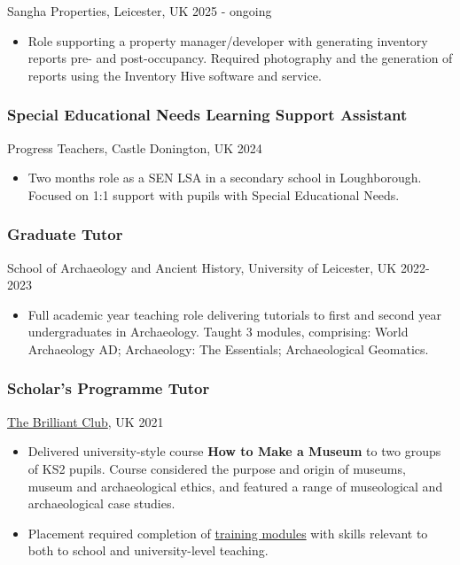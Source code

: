 \documentclass[11pt,a4paper]{article}
\providecommand{\tightlist}{%
  \setlength{\itemsep}{0pt}\setlength{\parskip}{0pt}}
\begin{document}
Sangha Properties, Leicester, UK 2025 - ongoing

\begin{itemize}
\tightlist
\item
  Role supporting a property manager/developer with generating inventory
  reports pre- and post-occupancy. Required photography and the
  generation of reports using the Inventory Hive software and service.
\end{itemize}

\subsubsection{Special Educational Needs Learning Support
Assistant}\label{special-educational-needs-learning-support-assistant}

Progress Teachers, Castle Donington, UK 2024

\begin{itemize}
\tightlist
\item
  Two months role as a SEN LSA in a secondary school in Loughborough.
  Focused on 1:1 support with pupils with Special Educational Needs.
\end{itemize}

\subsubsection{Graduate Tutor}\label{graduate-tutor}

School of Archaeology and Ancient History, University of Leicester, UK
2022-2023

\begin{itemize}
\tightlist
\item
  Full academic year teaching role delivering tutorials to first and
  second year undergraduates in Archaeology. Taught 3 modules,
  comprising: World Archaeology AD; Archaeology: The Essentials;
  Archaeological Geomatics.
\end{itemize}

\subsubsection{Scholar's Programme
Tutor}\label{scholars-programme-tutor}

\href{https://thebrilliantclub.org/}{The Brilliant Club}, UK 2021

\begin{itemize}
\tightlist
\item
  Delivered university-style course \textbf{How to Make a Museum} to two
  groups of KS2 pupils. Course considered the purpose and origin of
  museums, museum and archaeological ethics, and featured a range of
  museological and archaeological case studies.
\item
  Placement required completion of
  \href{https://thebrilliantclub.org/the-scholars-programme/for-researchers/training/}{training
  modules} with skills relevant to both to school and university-level
  teaching.
\end{itemize}
\end{document}
